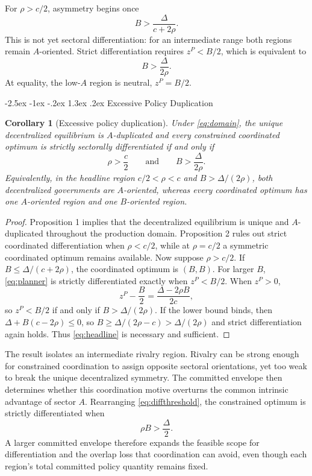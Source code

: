 \documentclass[12pt]{article}
\makeatletter
\newtheorem{corollary}{Corollary}
\renewcommand\section{\@startsection{section}{1}{\z@}%
  {-2.5ex \@plus -1ex \@minus -.2ex}%
  {1.3ex \@plus .2ex}%
  {\centering\normalfont\fontsize{14}{16}\selectfont\bfseries}}
\makeatother
\begin{document}
For $\rho>c/2$, asymmetry begins once
\[
B>\frac{\Delta}{c+2\rho}.
\]
This is not yet sectoral differentiation: for an intermediate range both regions remain $A$-oriented. Strict differentiation requires $z^P<B/2$, which is equivalent to
\begin{equation}
B>\frac{\Delta}{2\rho}.
\label{eq:diffthreshold}
\end{equation}
At equality, the low-$A$ region is neutral, $z^P=B/2$.

\section{Excessive Policy Duplication}

\begin{corollary}[Excessive policy duplication]
Under \eqref{eq:domain}, the unique decentralized equilibrium is $A$-duplicated and every constrained coordinated optimum is strictly sectorally differentiated if and only if
\begin{equation}
\rho>\frac{c}{2}
\qquad\text{and}\qquad
B>\frac{\Delta}{2\rho}.
\label{eq:headline}
\end{equation}
Equivalently, in the headline region $c/2<\rho<c$ and $B>\Delta/(2\rho)$, both decentralized governments are $A$-oriented, whereas every coordinated optimum has one $A$-oriented region and one $B$-oriented region.
\end{corollary}

\begin{proof}
Proposition 1 implies that the decentralized equilibrium is unique and $A$-duplicated throughout the production domain. Proposition 2 rules out strict coordinated differentiation when $\rho<c/2$, while at $\rho=c/2$ a symmetric coordinated optimum remains available. Now suppose $\rho>c/2$. If $B\le\Delta/(c+2\rho)$, the coordinated optimum is $(B,B)$. For larger $B$, \eqref{eq:planner} is strictly differentiated exactly when $z^P<B/2$. When $z^P>0$,
\[
z^P-\frac{B}{2}=\frac{\Delta-2\rho B}{2c},
\]
so $z^P<B/2$ if and only if $B>\Delta/(2\rho)$. If the lower bound binds, then $\Delta+B(c-2\rho)\le0$, so $B\ge\Delta/(2\rho-c)>\Delta/(2\rho)$ and strict differentiation again holds. Thus \eqref{eq:headline} is necessary and sufficient.
\end{proof}

The result isolates an intermediate rivalry region. Rivalry can be strong enough for constrained coordination to assign opposite sectoral orientations, yet too weak to break the unique decentralized symmetry. The committed envelope then determines whether this coordination motive overturns the common intrinsic advantage of sector $A$. Rearranging \eqref{eq:diffthreshold}, the constrained optimum is strictly differentiated when
\[
\rho B>\frac{\Delta}{2}.
\]
A larger committed envelope therefore expands the feasible scope for differentiation and the overlap loss that coordination can avoid, even though each region's total committed policy quantity remains fixed.
\end{document}
